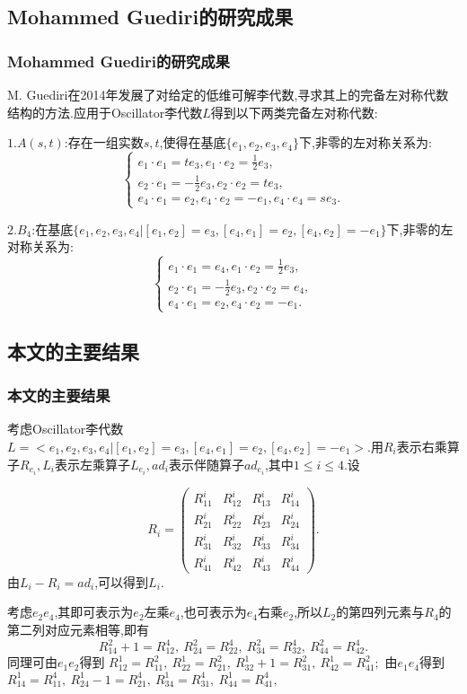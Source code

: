 \documentclass[aspectratio=169, 10pt, utf8, mathserif]{beamer}
\begin{document}
\subsection{Mohammed Guediri的研究成果}
\begin{frame}
	\frametitle{Mohammed Guediri的研究成果}
	M. Guediri在2014年发展了对给定的低维可解李代数,寻求其上的完备左对称代数结构的方法.应用于Oscillator李代数$L$得到以下两类完备左对称代数:

	$1.A(s,t)$:存在一组实数$s,t$,使得在基底$\{e_1,e_2,e_3,e_4\}$下,非零的左对称关系为:
	\begin{equation*}\left\{
	   \begin{array}{l}
		e_1\cdot e_1=te_3, e_1\cdot e_2=\frac{1}{2}e_3,\\
		e_2\cdot e_1=-\frac{1}{2}e_3, e_2\cdot e_2=te_3,\\
		e_4\cdot e_1=e_2, e_4\cdot e_2=-e_1,e_4\cdot e_4=se_3.
	   \end{array}\right.
	\end{equation*}

	$2.B_4$:在基底$\{e_1,e_2,e_3,e_4|[e_1,e_2]=e_3,[e_4,e_1]=e_2,[e_4,e_2]=-e_1\}$下,非零的左对称关系为:
	\begin{equation*}\left\{
		\begin{array}{l}
		    e_1\cdot e_1=e_4, e_1\cdot e_2=\frac{1}{2}e_3,\\
	  e_2\cdot e_1=-\frac{1}{2}e_3, e_2\cdot e_2=e_4,\\
      e_4\cdot e_1=e_2, e_4\cdot e_2=-e_1.
		\end{array}\right.
	 \end{equation*}
\end{frame}

\subsection{本文的主要结果}
\begin{frame}
	\frametitle{本文的主要结果}
		考虑Oscillator李代数$L=<e_1,e_2,e_3,e_4|[e_1,e_2]=e_3,[e_4,e_1]=e_2,[e_4,e_2]=-e_1>$.用$R_i$表示右乘算子$R_{e_i},L_i$表示左乘算子$L_{e_i},ad_i$表示伴随算子$ad_{e_i}$,其中$1\leq i\leq 4 $.设
	
		$$
		R_{i}=\left(\begin{smallmatrix}
		R_{11}^{i} & R_{12}^{i} & R_{13}^{i} & R_{14}^{i} \\
		R_{21}^{i} & R_{22}^{i} & R_{23}^{i} & R_{24}^{i} \\
		R_{31}^{i} & R_{32}^{i} & R_{33}^{i} & R_{34}^{i} \\
		R_{41}^{i} & R_{42}^{i} & R_{43}^{i} & R_{44}^{i}
		\end{smallmatrix}\right).
		$$
		\noindent 由$L_i-R_i=ad_i$,可以得到$L_i$.

		考虑$e_2e_4$,其即可表示为$e_2$左乘$e_4$,也可表示为$e_4$右乘$e_2$,所以$L_2$的第四列元素与$R_4$的第二列对应元素相等,即有
	$$ R_{14}^2+1=R_{12}^4,\ R_{24}^2=R_{22}^4,\ R_{34}^2=R_{32}^4,\ R_{44}^2=R_{42}^4. $$
	同理可由$e_1e_2$得到 $R_{12}^1=R_{11}^2,\ R_{22}^1=R_{21}^2,\ R_{32}^1+1=R_{31}^2,\ R_{42}^1=R_{41}^2; $
	由$e_1e_4$得到 $R_{14}^1=R_{11}^4,\ R_{24}^1-1=R_{21}^4,\ R_{34}^1=R_{31}^4,\ R_{44}^1=R_{41}^4, $
\end{frame}
\end{document}
